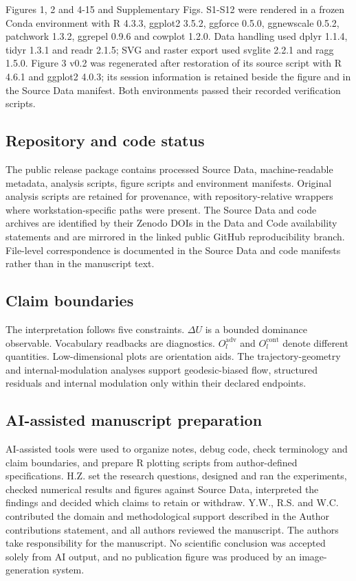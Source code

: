 \documentclass[11pt]{article}
\begin{document}
Figures 1, 2 and 4-15 and Supplementary Figs. S1-S12 were rendered in a frozen Conda environment with R 4.3.3, ggplot2 3.5.2, ggforce 0.5.0, ggnewscale 0.5.2, patchwork 1.3.2, ggrepel 0.9.6 and cowplot 1.2.0. Data handling used dplyr 1.1.4, tidyr 1.3.1 and readr 2.1.5; SVG and raster export used svglite 2.2.1 and ragg 1.5.0. Figure 3 v0.2 was regenerated after restoration of its source script with R 4.6.1 and ggplot2 4.0.3; its session information is retained beside the figure and in the Source Data manifest. Both environments passed their recorded verification scripts.

\subsection*{Repository and code status}
The public release package contains processed Source Data, machine-readable metadata, analysis scripts, figure scripts and environment manifests. Original analysis scripts are retained for provenance, with repository-relative wrappers where workstation-specific paths were present. The Source Data and code archives are identified by their Zenodo DOIs in the Data and Code availability statements and are mirrored in the linked public GitHub reproducibility branch. File-level correspondence is documented in the Source Data and code manifests rather than in the manuscript text.

\subsection*{Claim boundaries}
The interpretation follows five constraints. \(\Delta U\) is a bounded dominance observable. Vocabulary readbacks are diagnostics. \(O_l^{\mathrm{adv}}\) and \(O_l^{\mathrm{cont}}\) denote different quantities. Low-dimensional plots are orientation aids. The trajectory-geometry and internal-modulation analyses support geodesic-biased flow, structured residuals and internal modulation only within their declared endpoints.

\subsection*{AI-assisted manuscript preparation}
AI-assisted tools were used to organize notes, debug code, check terminology and claim boundaries, and prepare R plotting scripts from author-defined specifications. H.Z. set the research questions, designed and ran the experiments, checked numerical results and figures against Source Data, interpreted the findings and decided which claims to retain or withdraw. Y.W., R.S. and W.C. contributed the domain and methodological support described in the Author contributions statement, and all authors reviewed the manuscript. The authors take responsibility for the manuscript. No scientific conclusion was accepted solely from AI output, and no publication figure was produced by an image-generation system.
\end{document}
